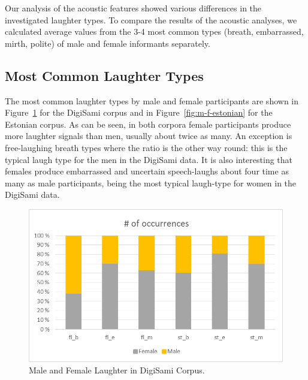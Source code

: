 \documentclass[10pt,journal,compsoc]{IEEEtran}
\begin{document}
Our analysis of the acoustic features showed various differences in the investigated laughter types. To compare the results of the acoustic analyses, we calculated average values from the 3-4 most common types (breath, embarrassed, mirth, polite) of male and female informants separately.

\subsection{Most Common Laughter Types}

The most common laughter types by male and female participants are shown in Figure~\ref{fig:m-f-digisami} for the DigiSami corpus and in Figure~\ref{fig:m-f-estonian} for the Estonian corpus.
As can be seen, in both corpora female participants produce more laughter signals than men, usually about twice as many. An exception is free-laughing breath types where the ratio is the other way round: this is the typical laugh type for the men in the DigiSami data. It is also interesting that females produce embarrassed and uncertain speech-laughs about four time as many as male participants, being the most typical laugh-type for women in the DigiSami data.

\begin{figure}[!t]
\centering
\includegraphics[width=1\linewidth]{images/M-F-DigiSami.png}
\caption{Male and Female Laughter in DigiSami Corpus.}
\label{fig:m-f-digisami}
\end{figure}
\end{document}
